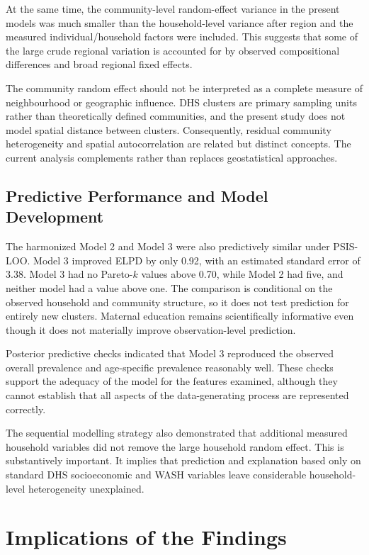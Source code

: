 At the same time, the community-level random-effect variance in the present models was much smaller than the household-level variance after region and the measured individual/household factors were included. This suggests that some of the large crude regional variation is accounted for by observed compositional differences and broad regional fixed effects.

The community random effect should not be interpreted as a complete measure of neighbourhood or geographic influence. DHS clusters are primary sampling units rather than theoretically defined communities, and the present study does not model spatial distance between clusters. Consequently, residual community heterogeneity and spatial autocorrelation are related but distinct concepts. The current analysis complements rather than replaces geostatistical approaches.

\subsection{Predictive Performance and Model Development}

The harmonized Model 2 and Model 3 were also predictively similar under PSIS-LOO. Model 3 improved ELPD by only 0.92, with an estimated standard error of 3.38. Model 3 had no Pareto-$k$ values above 0.70, while Model 2 had five, and neither model had a value above one. The comparison is conditional on the observed household and community structure, so it does not test prediction for entirely new clusters. Maternal education remains scientifically informative even though it does not materially improve observation-level prediction.

Posterior predictive checks indicated that Model 3 reproduced the observed overall prevalence and age-specific prevalence reasonably well. These checks support the adequacy of the model for the features examined, although they cannot establish that all aspects of the data-generating process are represented correctly.

The sequential modelling strategy also demonstrated that additional measured household variables did not remove the large household random effect. This is substantively important. It implies that prediction and explanation based only on standard DHS socioeconomic and WASH variables leave considerable household-level heterogeneity unexplained.

\section{Implications of the Findings}

